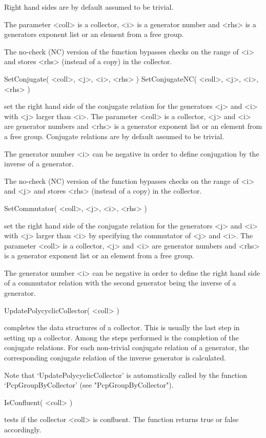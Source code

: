 Right hand sides are by default assumed to be trivial.

The parameter <coll> is a collector, <i> is a generator number and
<rhs> is a generators exponent list or an element from a free group.

The no-check (NC) version of the function bypasses checks on the range
of <i> and stores <rhs> (instead of a copy) in the collector.

\>SetConjugate( <coll>, <j>, <i>, <rhs> )
\>SetConjugateNC( <coll>, <j>, <i>, <rhs> )

set the right  hand side of the conjugate  relation for the generators
<j>  and <i>  with <j>  larger than  <i>.  The  parameter <coll>  is a
collector, <j> and <i> are  generator numbers and <rhs> is a generator
exponent list  or an element  from a free group.   Conjugate relations
are by default assumed to be trivial.

The  generator  number  <i>  can   be  negative  in  order  to  define
conjugation by the inverse of a generator.

The no-check (NC) version of the function bypasses checks on the range
of <i> and <j> and stores <rhs> (instead of a copy) in the collector.

\>SetCommutator( <coll>, <j>, <i>, <rhs> )

set the right  hand side of the conjugate  relation for the generators
<j> and <i>  with <j> larger than <i> by  specifying the commutator of
<j> and  <i>.  The parameter  <coll> is a  collector, <j> and  <i> are
generator numbers and <rhs> is a generator exponent list or an element
from a free group.

The  generator  number  <i>  can   be  negative  in  order  to  define
the right hand side of a commutator relation with the second generator
being the inverse of a generator.

\>UpdatePolycyclicCollector( <coll> )

completes the data  structures of  a  collector.  This is  usually the
last step in setting up a collector.  Among the steps performed is the
completion of the conjugate relations.  For each non-trivial conjugate
relation  of a generator, the corresponding  conjugate relation of the
inverse generator is calculated.

Note that  `UpdatePolycyclicCollector' is automatically  called by the
function `PcpGroupByCollector' (see "PcpGroupByCollector").

\>IsConfluent( <coll> )

tests if the collector <coll> is confluent.  The function returns true
or false accordingly.

